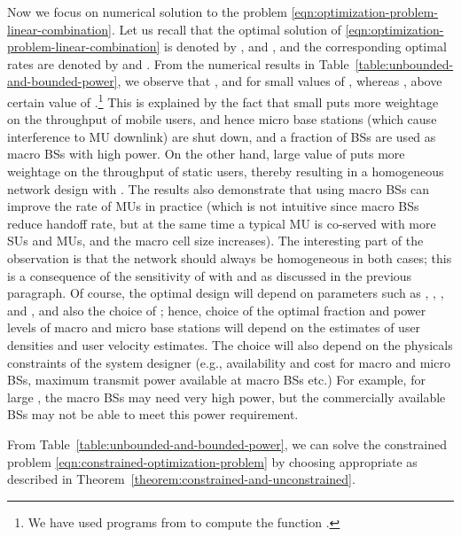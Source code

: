 \documentclass[10pt,journal]{IEEEtran}
\begin{document}
Now we focus on numerical solution to the problem \eqref{eqn:optimization-problem-linear-combination}. 
Let us recall that the optimal solution of \eqref{eqn:optimization-problem-linear-combination} is denoted  by 
,  and , and the corresponding optimal rates are denoted by 
 and . 
From the numerical results in Table~\ref{table:unbounded-and-bounded-power}, we observe that ,  and 
 for small values of , whereas ,  
above certain value of .\footnote{We have used programs from  \cite{keeler-programs} to compute the function 
.} This is explained 
by the fact that small  puts more weightage on the throughput of mobile users, and hence micro base stations 
(which cause interference to MU downlink) are shut down, and a fraction of BSs are used as macro BSs with high power. On the other hand, large value 
of  puts more weightage on the throughput of static users, thereby resulting in a homogeneous network design with 
. The results also demonstrate that using macro BSs can improve the rate of MUs in practice 
(which is not intuitive since macro BSs reduce handoff rate, but at the same time a typical MU is co-served with more SUs and MUs, and 
the macro cell size increases). The interesting part of the observation is 
that the network should always be homogeneous in both cases; this is a consequence of the sensitivity of  with 
 and  as discussed in the previous paragraph. 
Of course, the optimal design 
will depend on parameters such as , , ,  and , and also the choice of ; hence, 
choice of the optimal fraction and power levels of macro and micro base stations will depend on the estimates of user densities and user velocity 
estimates. The choice will also depend on the physicals constraints of the system designer (e.g., availability and cost for macro and micro 
BSs, maximum transmit power available at macro BSs etc.) For example, for large , the macro BSs may need very high power, but the 
commercially available BSs may not be able to meet this power requirement.

From Table~\ref{table:unbounded-and-bounded-power}, we can solve the constrained problem 
\eqref{eqn:constrained-optimization-problem} by choosing appropriate  as 
described in Theorem~\ref{theorem:constrained-and-unconstrained}.
\end{document}

